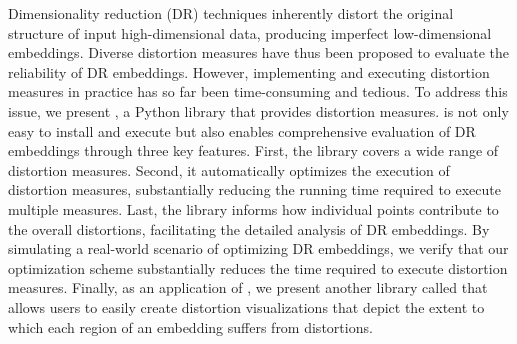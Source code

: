 Dimensionality reduction (DR) techniques inherently distort the original structure of input high-dimensional data, producing imperfect low-dimensional embeddings. Diverse distortion measures have thus been proposed to evaluate the reliability of DR embeddings.  
However, implementing and executing distortion measures in practice has so far been time-consuming and tedious. 
To address this issue, we present \library, a Python library that provides distortion measures.
\library is not only easy to install and execute but also
enables comprehensive evaluation of DR embeddings through three key features. First, the library covers a wide range of distortion measures. Second, it automatically optimizes the execution of distortion measures, substantially reducing the running time required to execute multiple measures.
Last, the library informs how individual points contribute to the overall distortions, facilitating the detailed analysis of DR embeddings. By simulating a real-world scenario of optimizing DR embeddings, we verify that our optimization scheme substantially reduces the time required to execute distortion measures. 
Finally, as an application of \library, we present another library called \vislib that allows users to easily create distortion visualizations that depict the extent to which each region of an embedding suffers from distortions.







